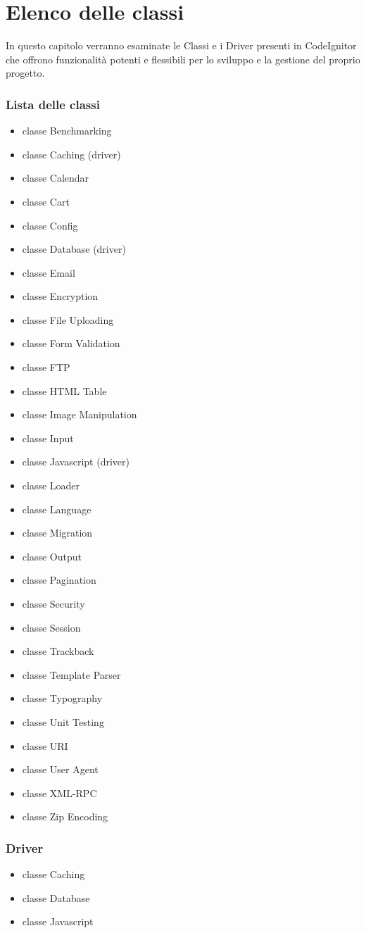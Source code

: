 \chapter{Elenco delle classi}
\label{cap:elencoclassi}

In questo capitolo verranno esaminate le Classi e i Driver presenti in CodeIgnitor che offrono funzionalità potenti e flessibili per lo sviluppo e la gestione del proprio progetto.

\subsection*{Lista delle classi}

\begin{itemize}
\item classe Benchmarking
\item classe Caching (driver)
\item classe Calendar
\item classe Cart
\item classe Config
\item classe Database (driver)
\item classe Email
\item classe Encryption
\item classe File Uploading
\item classe Form Validation
\item classe FTP
\item classe HTML Table
\item classe Image Manipulation
\item classe Input
\item classe Javascript (driver)
\item classe Loader
\item classe Language
\item classe Migration
\item classe Output
\item classe Pagination
\item classe Security
\item classe Session
\item classe Trackback
\item classe Template Parser
\item classe Typography
\item classe Unit Testing
\item classe URI
\item classe User Agent
\item classe XML-RPC
\item classe Zip Encoding
\end{itemize}

\subsection*{Driver}

\begin{itemize}
\item classe Caching
\item classe Database
\item classe Javascript
\end{itemize}